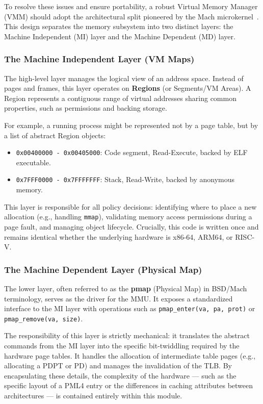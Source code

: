 \documentclass[a4paper,10pt,twoside]{report}
\theoremstyle{definition}
\begin{document}
To resolve these issues and ensure portability, a robust Virtual Memory Manager (VMM) should adopt the architectural split pioneered by the Mach microkernel~\cite{rashid1987machine}. This design separates the memory subsystem into two distinct layers: the Machine Independent (MI) layer and the Machine Dependent (MD) layer.

\subsubsection{The Machine Independent Layer (VM Maps)}

The high-level layer manages the logical view of an address space. Instead of pages and frames, this layer operates on \textbf{Regions} (or Segments/VM Areas). A Region represents a contiguous range of virtual addresses sharing common properties, such as permissions and backing storage.

For example, a running process might be represented not by a page table, but by a list of abstract Region objects:
\begin{itemize}
    \item \texttt{0x00400000 - 0x00405000}: Code segment, Read-Execute, backed by ELF executable.
    \item \texttt{0x7FFF0000 - 0x7FFFFFFF}: Stack, Read-Write, backed by anonymous memory.
\end{itemize}

This layer is responsible for all policy decisions: identifying where to place a new allocation (e.g., handling \texttt{mmap}), validating memory access permissions during a page fault, and managing object lifecycle. Crucially, this code is written once and remains identical whether the underlying hardware is x86-64, ARM64, or RISC-V.

\subsubsection{The Machine Dependent Layer (Physical Map)}

The lower layer, often referred to as the \textbf{pmap} (Physical Map) in BSD/Mach terminology, serves as the driver for the MMU. It exposes a standardized interface to the MI layer with operations such as \texttt{pmap\_enter(va, pa, prot)} or \texttt{pmap\_remove(va, size)}.

The responsibility of this layer is strictly mechanical: it translates the abstract commands from the MI layer into the specific bit-twiddling required by the hardware page tables. It handles the allocation of intermediate table pages (e.g., allocating a PDPT or PD) and manages the invalidation of the TLB. By encapsulating these details, the complexity of the hardware --- such as the specific layout of a PML4 entry or the differences in caching attributes between architectures --- is contained entirely within this module.
\end{document}
